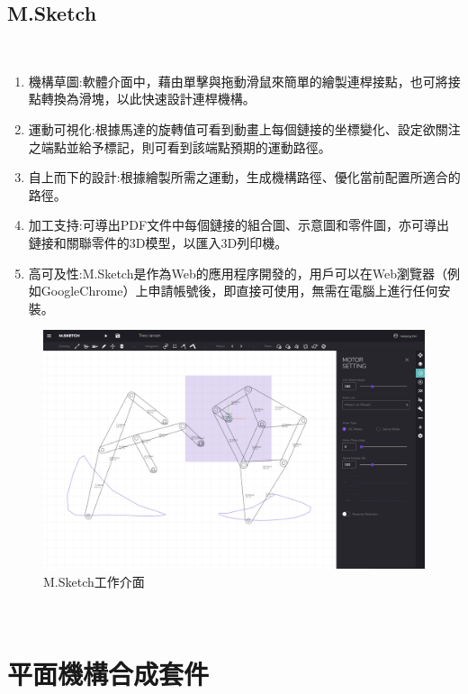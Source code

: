 \documentclass[14pt,a4paper]{report}  %
\newcommand{\fourteen}{\fontsize{14pt}{\baselineskip}\selectfont}%
\begin{document}
{	  	\subsection{M.Sketch}
       	\hspace*{\fill} \\        
       \fourteen {M.Sketch，一種原型設計工具，設計目的在為非專業人士提供簡單直觀的界面，輕鬆學習與使用幾何圖形的模擬，如圖2.2。其中有五個主要功能:}
       \begin{enumerate} 
       \item 機構草圖:軟體介面中，藉由單擊與拖動滑鼠來簡單的繪製連桿接點，也可將接點轉換為滑塊，以此快速設計連桿機構。
       \item 運動可視化:根據馬達的旋轉值可看到動畫上每個鏈接的坐標變化、設定欲關注之端點並給予標記，則可看到該端點預期的運動路徑。
       \item 自上而下的設計:根據繪製所需之運動，生成機構路徑、優化當前配置所適合的路徑。
       \item 加工支持:可導出PDF文件中每個鏈接的組合圖、示意圖和零件圖，亦可導出鏈接和關聯零件的3D模型，以匯入3D列印機。
       \item 高可及性:M.Sketch是作為Web的應用程序開發的，用戶可以在Web瀏覽器（例如GoogleChrome）上申請帳號後，即直接可使用，無需在電腦上進行任何安裝。
       \end{enumerate}
       
 		\begin{figure}[H]
        \centering
        \includegraphics[scale=0.25]{M.Sketch.jpg} 
        \caption{M.Sketch工作介面} 
        \label{fig:scale}
    	\end{figure}
\hspace*{\fill} \\
\newpage
      \section{平面機構合成套件}
}
\end{document}
